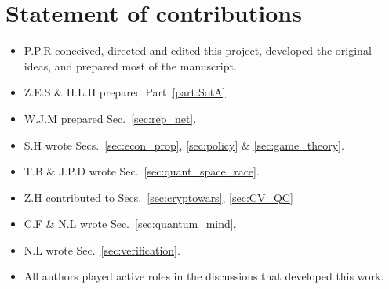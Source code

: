 %
%

\section*{Statement of contributions}

\begin{itemize}
\item P.P.R conceived, directed and edited this project, developed the original ideas, and prepared most of the manuscript.
\item Z.E.S \& H.L.H prepared Part~\ref{part:SotA}.
\item W.J.M prepared Sec.~\ref{sec:rep_net}. 
\item S.H wrote Secs.~\ref{sec:econ_prop}, \ref{sec:policy} \& \ref{sec:game_theory}.
\item T.B \& J.P.D wrote Sec.~\ref{sec:quant_space_race}.
\item Z.H contributed to Secs.~\ref{sec:cryptowars}, \ref{sec:CV_QC}
\item C.F \& N.L wrote Sec.~\ref{sec:quantum_mind}.
\item N.L wrote Sec.~\ref{sec:verification}.
\item All authors played active roles in the discussions that developed this work. 
\end{itemize}

